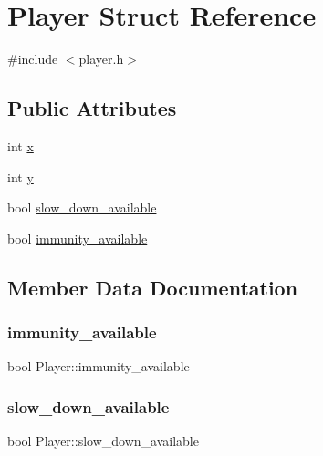 \hypertarget{structPlayer}{}\section{Player Struct Reference}
\label{structPlayer}


{\ttfamily \#include $<$player.\+h$>$}

\subsection*{Public Attributes}
\begin{DoxyCompactItemize}
\item 
int \mbox{\hyperlink{structPlayer_ad285b3cb25e4a46ca944b9a416c1b13f}{x}}
\item 
int \mbox{\hyperlink{structPlayer_a6da29d6e3783c6028c92647bbde478f5}{y}}
\item 
bool \mbox{\hyperlink{structPlayer_a72cf5fd93edf473d84b70b1a77c27f1b}{slow\+\_\+down\+\_\+available}}
\item 
bool \mbox{\hyperlink{structPlayer_acdb220fd1c78e47965627ce7f22138fd}{immunity\+\_\+available}}
\end{DoxyCompactItemize}


\subsection{Member Data Documentation}
\mbox{\label{structPlayer_acdb220fd1c78e47965627ce7f22138fd}} 
\subsubsection{\texorpdfstring{immunity\+\_\+available}{immunity\_available}}
{\footnotesize\ttfamily bool Player\+::immunity\+\_\+available}

\mbox{\label{structPlayer_a72cf5fd93edf473d84b70b1a77c27f1b}} 
\subsubsection{\texorpdfstring{slow\+\_\+down\+\_\+available}{slow\_down\_available}}
{\footnotesize\ttfamily bool Player\+::slow\+\_\+down\+\_\+available}

